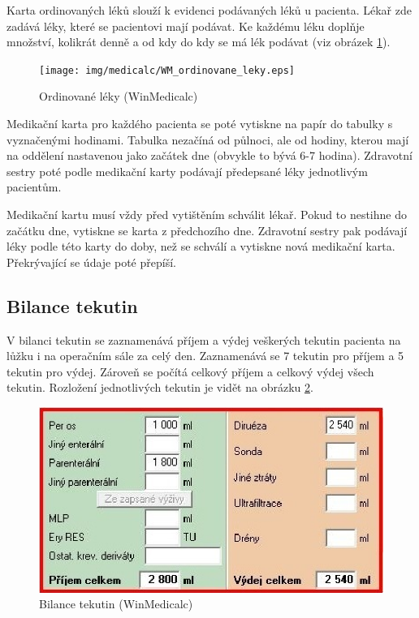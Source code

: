 Karta ordinovaných léků slouží k evidenci podávaných léků u pacienta. Lékař zde zadává léky, které se pacientovi mají podávat. Ke každému léku doplňje množství, kolikrát denně a od kdy do kdy se má lék podávat (viz obrázek \ref{fig:WM_ordinovane_leky}).

\begin{figure}[H]
	\centering
	\texttt{[image: img/medicalc/WM\_ordinovane\_leky.eps]}
	\caption{Ordinované léky (WinMedicalc)}
  \label{fig:WM_ordinovane_leky}
\end{figure}

Medikační karta pro každého pacienta se poté vytiskne na papír do tabulky s vyznačenými hodinami. Tabulka nezačíná od půlnoci, ale od hodiny, kterou mají na oddělení nastavenou jako začátek dne (obvykle to bývá 6-7 hodina). Zdravotní sestry poté podle medikační karty podávají předepsané léky jednotlivým pacientům.

Medikační kartu musí vždy před vytištěním schválit lékař. Pokud to nestihne do začátku dne, vytiskne se karta z předchozího dne. Zdravotní sestry pak podávají léky podle této karty do doby, než se schválí a vytiskne nová medikační karta. Překrývající se údaje poté přepíší.

\subsection{Bilance tekutin}

V bilanci tekutin se zaznamenává příjem a výdej veškerých tekutin pacienta na lůžku i na operačním sále za celý den. Zaznamenává se 7 tekutin pro příjem a 5 tekutin pro výdej. Zároveň se počítá celkový příjem a celkový výdej všech tekutin. Rozložení jednotlivých tekutin je vidět na obrázku \ref{fig:WM_bilance_tekutin}.

\begin{figure}[H]
	\centering
	\includegraphics{img/medicalc/WM_bilance_tekutin.eps}
	\caption{Bilance tekutin (WinMedicalc)}
  \label{fig:WM_bilance_tekutin}
\end{figure}


